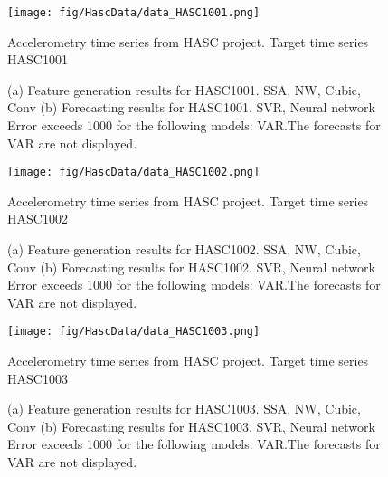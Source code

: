 \documentclass[12pt]{article}
\begin{document}
\begin{figure}
\centering
\texttt{[image: fig/HascData/data\_HASC1001.png]}
\caption{Accelerometry time series from HASC project. Target time series	HASC1001	}
\end{figure}


\begin{figure}
\centering
{}
\caption{(a)	Feature generation results for	HASC1001.	SSA, NW, Cubic, Conv	(b)	Forecasting results for	HASC1001.	SVR, Neural network	Error exceeds 1000 for the following models: VAR.The forecasts for VAR are not displayed.	}
\end{figure}


\begin{figure}
\centering
\texttt{[image: fig/HascData/data\_HASC1002.png]}
\caption{Accelerometry time series from HASC project. Target time series	HASC1002	}
\end{figure}


\begin{figure}
\centering
{}
\caption{(a)	Feature generation results for	HASC1002.	SSA, NW, Cubic, Conv	(b)	Forecasting results for	HASC1002.	SVR, Neural network	Error exceeds 1000 for the following models: VAR.The forecasts for VAR are not displayed.	}
\end{figure}


\begin{figure}
\centering
\texttt{[image: fig/HascData/data\_HASC1003.png]}
\caption{Accelerometry time series from HASC project. Target time series	HASC1003	}
\end{figure}


\begin{figure}
\centering
{}
\caption{(a)	Feature generation results for	HASC1003.	SSA, NW, Cubic, Conv	(b)	Forecasting results for	HASC1003.	SVR, Neural network	Error exceeds 1000 for the following models: VAR.The forecasts for VAR are not displayed.	}
\end{figure}
\end{document}
